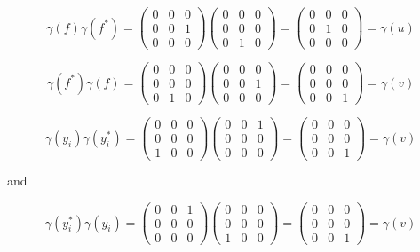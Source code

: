 \begin{solution}
    $$\gamma(f)\gamma(f^*)=\left(\begin{array}{ccc} 0 & 0 & 0 \\ 0 & 0 & 1 \\ 0 & 0 & 0 \end{array}\right)
    \left(\begin{array}{ccc} 0 & 0 & 0 \\ 0 & 0 & 0 \\ 0 & 1 & 0 \end{array}\right)
    =\left(\begin{array}{ccc} 0 & 0 & 0 \\ 0 & 1 & 0 \\ 0 & 0 & 0 \end{array}\right)=\gamma(u)$$

    $$\gamma(f^*)\gamma(f)=\left(\begin{array}{ccc} 0 & 0 & 0 \\ 0 & 0 & 0 \\ 0 & 1 & 0 \end{array}\right)
    \left(\begin{array}{ccc} 0 & 0 & 0 \\ 0 & 0 & 1 \\ 0 & 0 & 0 \end{array}\right)
    =\left(\begin{array}{ccc} 0 & 0 & 0 \\ 0 & 0 & 0 \\ 0 & 0 & 1 \end{array}\right)=\gamma(v)$$

    $$\gamma(y_i)\gamma(y_i^*)=\left(\begin{array}{ccc} 0 & 0 & 0 \\ 0 & 0 & 0 \\ 1 & 0 & 0 \end{array}\right)
    \left(\begin{array}{ccc} 0 & 0 & 1 \\ 0 & 0 & 0 \\ 0 & 0 & 0 \end{array}\right)
    =\left(\begin{array}{ccc} 0 & 0 & 0 \\ 0 & 0 & 0 \\ 0 & 0 & 1 \end{array}\right)=\gamma(v)$$

    and

    $$\gamma(y_i^*)\gamma(y_i)=\left(\begin{array}{ccc} 0 & 0 & 1 \\ 0 & 0 & 0 \\ 0 & 0 & 0 \end{array}\right)
    \left(\begin{array}{ccc} 0 & 0 & 0 \\ 0 & 0 & 0 \\ 1 & 0 & 0 \end{array}\right)
    =\left(\begin{array}{ccc} 0 & 0 & 0 \\ 0 & 0 & 0 \\ 0 & 0 & 1 \end{array}\right)=\gamma(v)$$


\end{solution}
